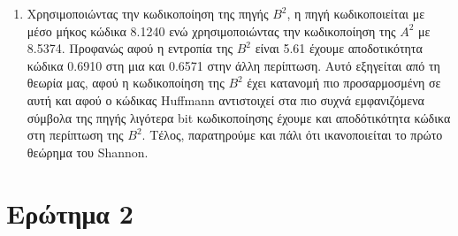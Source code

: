 \documentclass{article}
\begin{document}
\begin{enumerate}
        \item Χρησιμοποιώντας την κωδικοποίηση της πηγής $B^2$, η πηγή κωδικοποιείται με μέσο μήκος κώδικα 8.1240 ενώ χρησιμοποιώντας την κωδικοποίηση της $A^2$ με 8.5374. Προφανώς αφού η εντροπία της $B^2$ είναι 5.61 έχουμε αποδοτικότητα κώδικα 0.6910 στη μια και 0.6571 στην άλλη περίπτωση. Αυτό εξηγείται από τη θεωρία μας, αφού η κωδικοποίηση της $B^2$ έχει κατανομή πιο προσαρμοσμένη σε αυτή και αφού ο κώδικας Huffmann αντιστοιχεί στα πιο συχνά εμφανιζόμενα σύμβολα της πηγής λιγότερα bit κωδικοποίησης έχουμε και αποδότικότητα κώδικα στη περίπτωση της $B^2$. Τέλος, παρατηρούμε και πάλι ότι ικανοποιείται το πρώτο θεώρημα του Shannon.
    \end{enumerate}

\newpage

\section{Ερώτημα 2}
\end{document}
